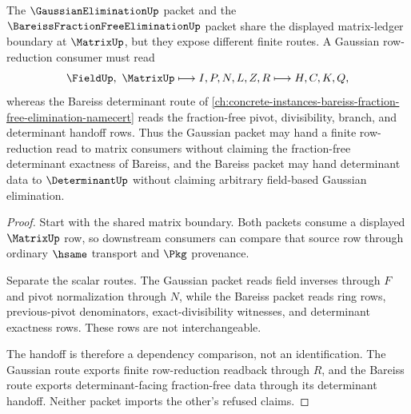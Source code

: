 \begin{theorem}
\label{thm:gaussian-elimination-bareiss-row-reduction-handoff}
The $\GaussianEliminationUp$ packet and the $\BareissFractionFreeEliminationUp$ packet share the displayed matrix-ledger boundary at $\MatrixUp$, but they expose different finite routes. A Gaussian row-reduction consumer must read
$$
\FieldUp,\ \MatrixUp \longmapsto I,P,N,L,Z,R \longmapsto H,C,K,Q,
$$
whereas the Bareiss determinant route of \autoref{ch:concrete-instances-bareiss-fraction-free-elimination-namecert} reads the fraction-free pivot, divisibility, branch, and determinant handoff rows. Thus the Gaussian packet may hand a finite row-reduction read to matrix consumers without claiming the fraction-free determinant exactness of Bareiss, and the Bareiss packet may hand determinant data to $\DeterminantUp$ without claiming arbitrary field-based Gaussian elimination.
\end{theorem}
\begin{proof}
Start with the shared matrix boundary. Both packets consume a displayed $\MatrixUp$ row, so downstream consumers can compare that source row through ordinary $\hsame$ transport and $\Pkg$ provenance.

Separate the scalar routes. The Gaussian packet reads field inverses through $F$ and pivot normalization through $N$, while the Bareiss packet reads ring rows, previous-pivot denominators, exact-divisibility witnesses, and determinant exactness rows. These rows are not interchangeable.

The handoff is therefore a dependency comparison, not an identification. The Gaussian route exports finite row-reduction readback through $R$, and the Bareiss route exports determinant-facing fraction-free data through its determinant handoff. Neither packet imports the other's refused claims.
\end{proof}


